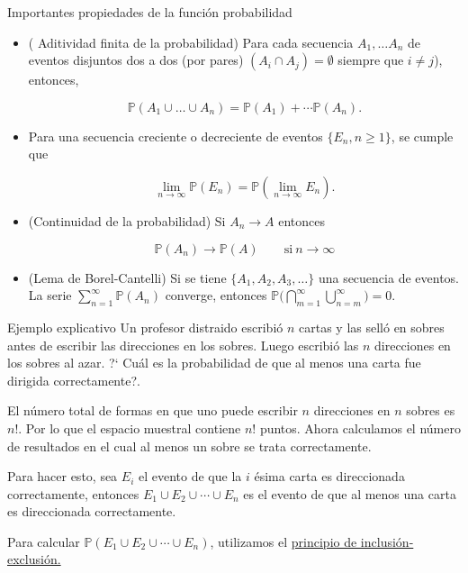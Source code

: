 \documentclass{beamer}
\begin{document}
\begin{frame}{Importantes propiedades de la funci\'on  probabilidad}
	
	\begin{itemize}
\item \scriptsize{ ( Aditividad finita de la probabilidad) Para cada secuencia $A_1, \dots A_n$ de eventos disjuntos dos a dos (por pares) $(A_i \cap A_j) = \emptyset $ siempre que $i \neq j$), entonces,}


\[
\mathbb{P}(A_1 \cup \dots \cup A_n) = \mathbb{P}(A_1) + \cdots \mathbb{P}(A_n).
\]
\item \scriptsize{ Para una secuencia creciente o decreciente de eventos $\{E_n, n \geq 1 \}$, se cumple que}

\[
\lim_{n \rightarrow \infty}\mathbb{P}(E_n) = \mathbb{P}(\lim_{n \rightarrow \infty}E_n).
\]
\item \scriptsize{(Continuidad de la probabilidad) Si $A_n \rightarrow A $ entonces }

\[
\mathbb{P}(A_n) \rightarrow \mathbb{P}(A)  \qquad \mbox{si} \  n \rightarrow \infty
\]
\item \scriptsize{(Lema de Borel-Cantelli) Si se tiene  $\{ A_1, A_2, A_3, \dots \}$ una secuencia de eventos. La serie $\displaystyle \sum_{n =1}^{\infty}\mathbb{P}(A_n)$ converge, entonces} $\mathbb{P}\Biggl(\bigcap_{m =1}^{\infty}\bigcup_{n = m}^{\infty}\Biggr) = 0$.
\end{itemize}
\end{frame}


\begin{frame}{Ejemplo explicativo}
\small{Un profesor distraido escribi\'o  $n$ cartas y las sell\'o en sobres antes de escribir las direcciones en los sobres. Luego escribi\'o las $n$ direcciones en los sobres al azar. ?` Cu\'al es la probabilidad de que al menos una carta fue dirigida correctamente?.}

\vspace{0.2cm}
	
	
\scriptsize{El n\'umero total de formas en que uno puede escribir $n$ direcciones en $n$ sobres es $n!$. Por lo que el espacio muestral  contiene $n!$ puntos. Ahora calculamos el n\'umero de resultados en el cual  al menos un sobre se trata correctamente. 


\vspace{0.2cm}

Para hacer esto, sea $E_i$ el evento de que la $i$  \'esima carta es direccionada correctamente,  entonces $E_1 \cup E_2 \cup 
\cdots \cup E_n $ es el evento de que al menos una  carta es direccionada correctamente.

\vspace{0.2cm}

Para calcular $\mathbb{P}(E_1 \cup E_2 \cup \cdots \cup E_n)$, utilizamos el \underline{principio de inclusi\'on-exclusi\'on.}
}
\end{frame}
\end{document}
